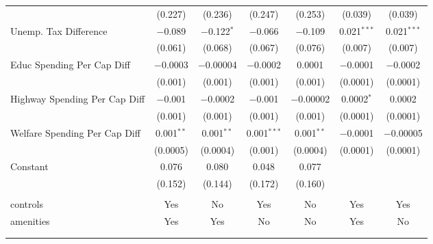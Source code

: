 \begin{table}[!htbp]
\begin{tabular}{@{\extracolsep{5pt}}lcccccc}
  & (0.227) & (0.236) & (0.247) & (0.253) & (0.039) & (0.039) \\ 
  Unemp. Tax Difference & $-$0.089 & $-$0.122$^{*}$ & $-$0.066 & $-$0.109 & 0.021$^{***}$ & 0.021$^{***}$ \\ 
  & (0.061) & (0.068) & (0.067) & (0.076) & (0.007) & (0.007) \\ 
  Educ Spending Per Cap Diff & $-$0.0003 & $-$0.00004 & $-$0.0002 & 0.0001 & $-$0.0001 & $-$0.0002 \\ 
  & (0.001) & (0.001) & (0.001) & (0.001) & (0.0001) & (0.0001) \\ 
  Highway Spending Per Cap Diff & $-$0.001 & $-$0.0002 & $-$0.001 & $-$0.00002 & 0.0002$^{*}$ & 0.0002 \\ 
  & (0.001) & (0.001) & (0.001) & (0.001) & (0.0001) & (0.0001) \\ 
  Welfare Spending Per Cap Diff & 0.001$^{**}$ & 0.001$^{**}$ & 0.001$^{***}$ & 0.001$^{**}$ & $-$0.0001 & $-$0.00005 \\ 
  & (0.0005) & (0.0004) & (0.001) & (0.0004) & (0.0001) & (0.0001) \\ 
  Constant & 0.076 & 0.080 & 0.048 & 0.077 &  &  \\ 
  & (0.152) & (0.144) & (0.172) & (0.160) &  &  \\ 
 \hline \\[-1.8ex] 
controls & Yes & No & Yes & No & Yes & Yes \\ 
amenities & Yes & Yes & No & No & Yes & No \\ 
\hline \\[-1.8ex] 
\hline 
\hline \\[-1.8ex] 
\end{tabular} 
\end{table} 

